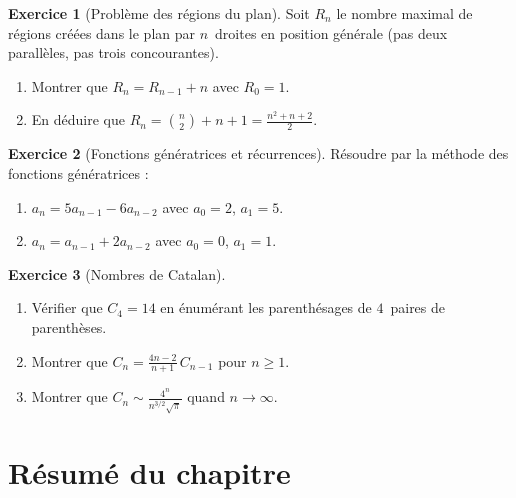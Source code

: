 \documentclass[12pt,a4paper,openany]{book}
\theoremstyle{definition}
\newtheorem{exercice}{Exercice}[chapter]
\theoremstyle{plain}
\theoremstyle{remark}
\begin{document}
\begin{exercice}[Problème des régions du plan]
\label{exo:regions-plan}
Soit $R_n$ le nombre maximal de régions créées dans le plan par $n$~droites
en position générale (pas deux parallèles, pas trois concourantes).
\begin{enumerate}[label=(\alph*)]
  \item Montrer que $R_n = R_{n-1} + n$ avec $R_0 = 1$.
  \item En déduire que $R_n = \binom{n}{2} + n + 1 = \frac{n^2 + n + 2}{2}$.
\end{enumerate}
\end{exercice}

\begin{exercice}[Fonctions génératrices et récurrences]
\label{exo:gen-rec}
Résoudre par la méthode des fonctions génératrices :
\begin{enumerate}[label=(\alph*)]
  \item $a_n = 5a_{n-1} - 6a_{n-2}$ avec $a_0 = 2$, $a_1 = 5$.
  \item $a_n = a_{n-1} + 2a_{n-2}$ avec $a_0 = 0$, $a_1 = 1$.
\end{enumerate}
\end{exercice}

\begin{exercice}[Nombres de Catalan]
\label{exo:catalan}
\begin{enumerate}[label=(\alph*)]
  \item Vérifier que $C_4 = 14$ en énumérant les parenthésages de $4$~paires
    de parenthèses.
  \item Montrer que $C_n = \frac{4n-2}{n+1}\, C_{n-1}$ pour $n \geq 1$.
  \item Montrer que $C_n \sim \frac{4^n}{n^{3/2}\sqrt{\pi}}$ quand $n \to \infty$.
\end{enumerate}
\end{exercice}

\section*{Résumé du chapitre}
\end{document}
